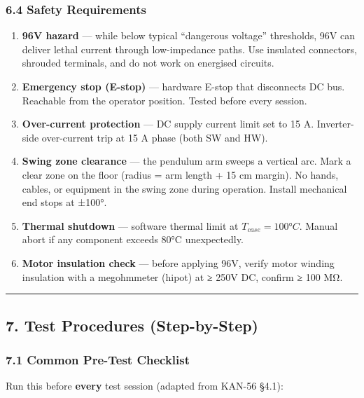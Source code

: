 \documentclass[
]{article}
\providecommand{\tightlist}{%
  \setlength{\itemsep}{0pt}\setlength{\parskip}{0pt}}
\begin{document}
\subsubsection{6.4 Safety Requirements}\label{safety-requirements}

\begin{enumerate}
\def\labelenumi{\arabic{enumi}.}
\tightlist
\item
  \textbf{96V hazard} --- while below typical ``dangerous voltage''
  thresholds, 96V can deliver lethal current through low-impedance
  paths. Use insulated connectors, shrouded terminals, and do not work
  on energised circuits.
\item
  \textbf{Emergency stop (E-stop)} --- hardware E-stop that disconnects
  DC bus. Reachable from the operator position. Tested before every
  session.
\item
  \textbf{Over-current protection} --- DC supply current limit set to 15
  A. Inverter-side over-current trip at 15 A phase (both SW and HW).
\item
  \textbf{Swing zone clearance} --- the pendulum arm sweeps a vertical
  arc. Mark a clear zone on the floor (radius = arm length + 15 cm
  margin). No hands, cables, or equipment in the swing zone during
  operation. Install mechanical end stops at ±100°.
\item
  \textbf{Thermal shutdown} --- software thermal limit at
  \(T_{case} = 100°C\). Manual abort if any component exceeds 80°C
  unexpectedly.
\item
  \textbf{Motor insulation check} --- before applying 96V, verify motor
  winding insulation with a megohmmeter (hipot) at ≥ 250V DC, confirm ≥
  100 MΩ.
\end{enumerate}

\begin{center}\rule{0.5\linewidth}{0.5pt}\end{center}

\subsection{7. Test Procedures
(Step-by-Step)}\label{test-procedures-step-by-step}

\subsubsection{7.1 Common Pre-Test
Checklist}\label{common-pre-test-checklist}

Run this before \textbf{every} test session (adapted from KAN-56 §4.1):
\end{document}
